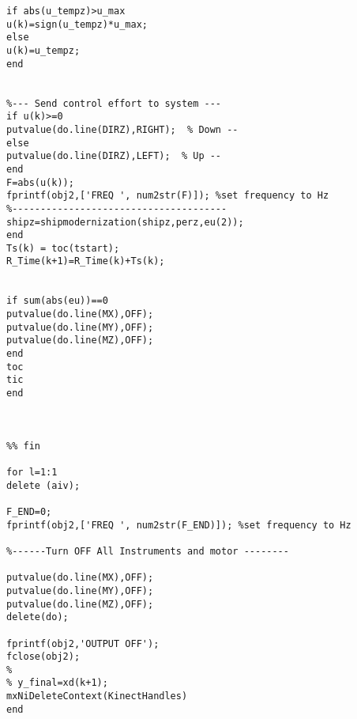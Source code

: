 \begin{lstlisting}
if abs(u_tempz)>u_max
u(k)=sign(u_tempz)*u_max;
else
u(k)=u_tempz;
end


%--- Send control effort to system ---
if u(k)>=0
putvalue(do.line(DIRZ),RIGHT);  % Down --
else
putvalue(do.line(DIRZ),LEFT);  % Up --
end
F=abs(u(k));
fprintf(obj2,['FREQ ', num2str(F)]); %set frequency to Hz
%--------------------------------------
shipz=shipmodernization(shipz,perz,eu(2));
end
Ts(k) = toc(tstart);
R_Time(k+1)=R_Time(k)+Ts(k);


if sum(abs(eu))==0
putvalue(do.line(MX),OFF);
putvalue(do.line(MY),OFF);
putvalue(do.line(MZ),OFF);
end
toc
tic
end



%% fin

for l=1:1
delete (aiv);

F_END=0;
fprintf(obj2,['FREQ ', num2str(F_END)]); %set frequency to Hz

%------Turn OFF All Instruments and motor --------

putvalue(do.line(MX),OFF);
putvalue(do.line(MY),OFF);
putvalue(do.line(MZ),OFF);
delete(do);

fprintf(obj2,'OUTPUT OFF');
fclose(obj2);
% 
% y_final=xd(k+1);
mxNiDeleteContext(KinectHandles)
end
\end{lstlisting}